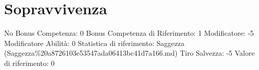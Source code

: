 \section{Sopravvivenza}\label{sopravvivenza}

\begin{description}
\tightlist
\item[Tags: ABI]
No Bonus Competenza: 0 Bonus Competenza di Riferimento: 1 Modificatore:
-5 Modificatore Abilità: 0 Statistica di riferimento: Saggezza
(Saggezza\%20a8726103e53547ada06413bc41d7a166.md) Tiro Salvezza: -5
Valore di riferimento: 0
\end{description}
